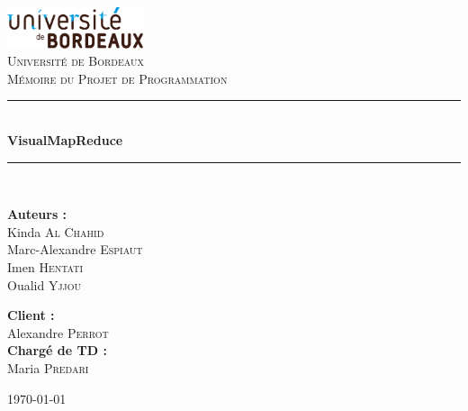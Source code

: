 \documentclass[12pt,a4paper]{report}
\newcommand{\HRule}{\rule{\linewidth}{0.5mm}}
\begin{document}
\begin{titlepage}
\begin{center}

\includegraphics[width=0.3\textwidth]{images/universite_bordeaux_logo.pdf}\\[1cm]    

\textsc{\LARGE Université de Bordeaux}\\[1.5cm]

\textsc{\Large Mémoire du Projet de Programmation}\\[0.5cm]

\vspace{30pt}
\HRule \\[0.4cm]
{ \huge \bfseries VisualMapReduce}\\[0.4cm]

\HRule \\[1.5cm]

\begin{minipage}{0.4\textwidth}
\begin{flushleft} \large
\textbf{Auteurs :}\\
Kinda \textsc{Al Chahid}\\
Marc-Alexandre \textsc{Espiaut}\\
Imen \textsc{Hentati}\\
Oualid \textsc{Yjjou}
\end{flushleft}
\end{minipage}
\begin{minipage}{0.4\textwidth}
\begin{flushright} \large
\textbf{Client :} \\
Alexandre \textsc{Perrot}\\
\textbf{Chargé de TD :} \\
Maria \textsc{Predari}
\end{flushright}
\end{minipage}

\vfill

{\large \today}

\end{center}

\end{titlepage}


\tableofcontents


















\end{document}
